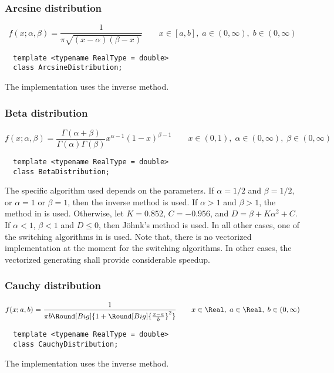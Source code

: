 \subsubsection{Arcsine distribution}

\begin{equation*}
  f(x;\alpha,\beta) = \frac{1}{\pi\sqrt{(x - \alpha)(\beta - x)}} \qquad
  x \in [a, b],\; a \in (0,\infty),\; b \in (0,\infty)
\end{equation*}
\begin{Verbatim}
  template <typename RealType = double>
  class ArcsineDistribution;
\end{Verbatim}
The implementation uses the inverse method.

\subsubsection{Beta distribution}

\begin{equation*}
  f(x;\alpha,\beta) =
  \frac{\Gamma(\alpha + \beta)}{\Gamma(\alpha)\Gamma(\beta)}
  x^{\alpha - 1}(1 - x)^{\beta - 1} \qquad
  x \in (0, 1),\; \alpha \in (0,\infty),\; \beta \in (0,\infty)
\end{equation*}
\begin{Verbatim}
  template <typename RealType = double>
  class BetaDistribution;
\end{Verbatim}
The specific algorithm used depends on the parameters. If $\alpha = 1/2$ and
$\beta = 1/2$, or $\alpha = 1$ or $\beta = 1$, then the inverse method is used.
If $\alpha > 1$ and $\beta > 1$, the method in \textcite{Cheng:1978jl} is used.
Otherwise, let $K = 0.852$, $C = -0.956$, and $D = \beta + K\alpha^2 + C$. If
$\alpha < 1$, $\beta < 1$ and $D \le 0$, then Jöhnk's method
\parencite[sec.~3.5]{Devroye:1986gi} is used. In all other cases, one of the
switching algorithms in \textcite{Atkinson:1979es} is used. Note that, there is
no vectorized implementation at the moment for the switching algorithms. In
other cases, the vectorized generating shall provide considerable speedup.

\subsubsection{Cauchy distribution}

\begin{equation*}
  f(x;a,b) =
  \frac{1}{\pi b\Round[Big]{1 + \Round[Big]{\frac{x - a}{b}}^2}} \qquad
  x \in \Real,\; a \in \Real,\; b \in (0,\infty)
\end{equation*}
\begin{Verbatim}
  template <typename RealType = double>
  class CauchyDistribution;
\end{Verbatim}
The implementation uses the inverse method.

